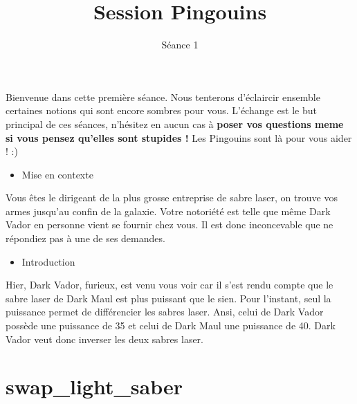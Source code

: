 \documentclass{koala-en}
\begin{document}
\title{Session Pingouins}
\subtitle{Séance 1}

\maketitle

{
    Bienvenue dans cette première séance. \newline
    Nous tenterons d'éclaircir ensemble certaines notions qui sont encore sombres pour vous.\newline
    L'échange est le but principal de ces séances, n'hésitez en aucun cas à \textbf{poser vos questions meme si vous pensez qu'elles sont stupides !} 
    \newline
  Les Pingouins sont là pour vous aider ! :) \newline
  \newline \newline
  \begin{itemize}
      \item
Mise en contexte
\end{itemize}
Vous êtes le dirigeant de la plus grosse entreprise de sabre laser, on trouve vos armes jusqu'au confin de la galaxie.
Votre notoriété est telle que même Dark Vador en personne vient se fournir chez vous.
Il est donc inconcevable que ne répondiez pas à une de ses demandes.
\newline \newline
\begin{itemize}
    \item
Introduction
\end{itemize}
Hier, Dark Vador, furieux, est venu vous voir car il s'est rendu compte que le sabre laser de Dark Maul est plus puissant que le sien.
Pour l'instant, seul la puissance permet de différencier les sabres laser.
Ansi, celui de Dark Vador possède une puissance de 35 et celui de Dark Maul une puissance de 40. Dark Vador veut donc inverser les deux sabres laser.
}

\newpage
\thispagestyle{empty}

\tableofcontents

\clearpage
\thispagestyle{empty}
\newpage

\chapter{swap\_light\_saber}
\end{document}
